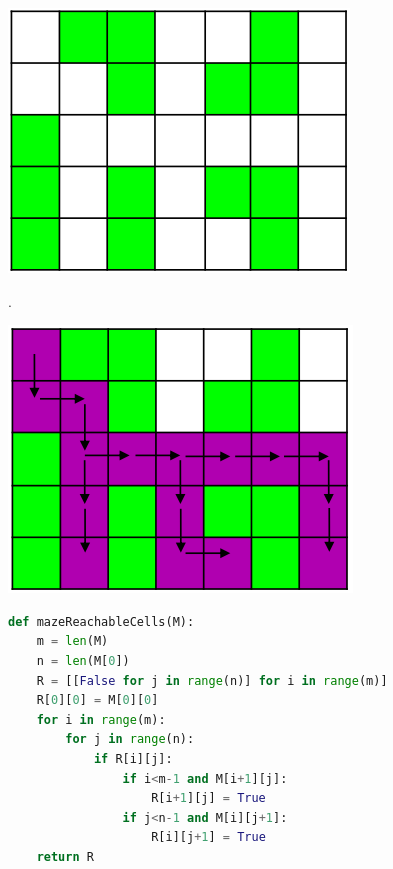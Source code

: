 \documentclass[12pt,oneside]{book}
\begin{document}
\begin{center}
	\begin{minipage}{0.3\linewidth}
		\includegraphics[width=\linewidth]{../pic/python/17}
	\end{minipage}
	\begin{minipage}{0.3\linewidth}
		.
	\end{minipage}
	\begin{minipage}{0.3\linewidth}
		\includegraphics[width=\linewidth]{../pic/python/18}
	\end{minipage}
\end{center}
{\small\begin{lstlisting}[language=python]
def mazeReachableCells(M):
	m = len(M)
	n = len(M[0])
	R = [[False for j in range(n)] for i in range(m)]
	R[0][0] = M[0][0]
	for i in range(m):
		for j in range(n):
			if R[i][j]:
				if i<m-1 and M[i+1][j]:
					R[i+1][j] = True  
				if j<n-1 and M[i][j+1]:
					R[i][j+1] = True 
	return R
\end{lstlisting}}
\end{document}
